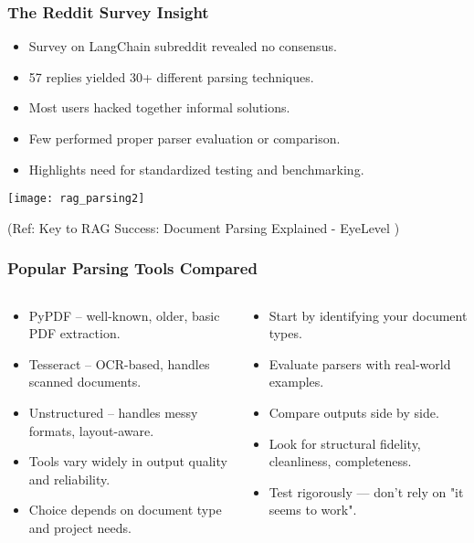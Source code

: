 \begin{frame}[fragile]\frametitle{The Reddit Survey Insight}

	  \begin{itemize}
		\item Survey on LangChain subreddit revealed no consensus.
		\item 57 replies yielded 30+ different parsing techniques.
		\item Most users hacked together informal solutions.
		\item Few performed proper parser evaluation or comparison.
		\item Highlights need for standardized testing and benchmarking.
	  \end{itemize}


		\begin{center}
		  \texttt{[image: rag\_parsing2]}
		  
		{\tiny (Ref: Key to RAG Success: Document Parsing Explained - EyeLevel )}
		  
		\end{center}

\end{frame}

\begin{frame}[fragile]\frametitle{Popular Parsing Tools Compared}

\begin{columns}
    \begin{column}[T]{0.5\linewidth}
	  \begin{itemize}
		\item PyPDF – well-known, older, basic PDF extraction.
		\item Tesseract – OCR-based, handles scanned documents.
		\item Unstructured – handles messy formats, layout-aware.
		\item Tools vary widely in output quality and reliability.
		\item Choice depends on document type and project needs.
	  \end{itemize}

    \end{column}
    \begin{column}[T]{0.5\linewidth}
	  \begin{itemize}
		\item Start by identifying your document types.
		\item Evaluate parsers with real-world examples.
		\item Compare outputs side by side.
		\item Look for structural fidelity, cleanliness, completeness.
		\item Test rigorously — don’t rely on "it seems to work".
	  \end{itemize}
    \end{column}
  \end{columns}  
 

\end{frame}


